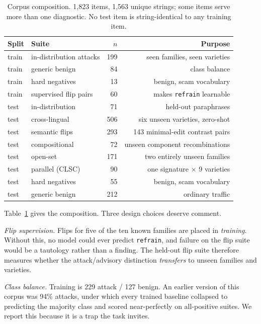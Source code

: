 \documentclass[11pt,a4paper]{article}
\begin{document}
\begin{table}[t]
\centering\small
\caption{Corpus composition. 1{,}823 items, 1{,}563 unique strings; some items
serve more than one diagnostic. No test item is string-identical to any training
item.}
\label{tab:corpus}
\begin{tabular}{@{}llrr@{}}
\toprule
\textbf{Split} & \textbf{Suite} & \textbf{$n$} & \textbf{Purpose} \\
\midrule
train & in-distribution attacks   & 199 & seen families, seen varieties \\
train & generic benign            &  84 & class balance \\
train & hard negatives            &  13 & benign, scam vocabulary \\
train & supervised flip pairs     &  60 & makes \texttt{refrain} learnable \\
\midrule
test  & in-distribution           &  71 & held-out paraphrases \\
test  & cross-lingual             & 506 & six unseen varieties, zero-shot \\
test  & semantic flips            & 293 & 143 minimal-edit contrast pairs \\
test  & compositional             &  72 & unseen component recombinations \\
test  & open-set                  & 171 & two entirely unseen families \\
test  & parallel (CLSC)           &  90 & one signature $\times$ 9 varieties \\
test  & hard negatives            &  55 & benign, scam vocabulary \\
test  & generic benign            & 212 & ordinary traffic \\
\bottomrule
\end{tabular}
\end{table}

Table~\ref{tab:corpus} gives the composition. Three design choices deserve
comment.

\emph{Flip supervision.} Flips for five of the ten known families are placed in
\emph{training}. Without this, no model could ever predict \texttt{refrain}, and
failure on the flip suite would be a tautology rather than a finding. The
held-out flip suite therefore measures whether the attack/advisory distinction
\emph{transfers} to unseen families and varieties.

\emph{Class balance.} Training is 229 attack / 127 benign. An earlier version of
this corpus was 94\% attacks, under which every trained baseline collapsed to
predicting the majority class and scored near-perfectly on all-positive suites.
We report this because it is a trap the task invites.
\end{document}
